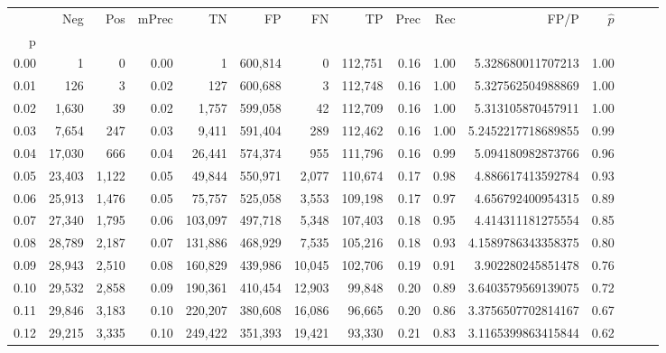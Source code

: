 \begin{tabular}{rrrrrrrrrrrrrrr}
\toprule
{} &     Neg &    Pos & mPrec &       TN &       FP &       FN &       TP &  Prec &   Rec &                    FP/P & $\hat{p}$ \\
p    &         &        &       &          &          &          &          &       &       &                         &           \\
\midrule
0.00 &       1 &      0 &  0.00 &        1 &  600,814 &        0 &  112,751 &  0.16 &  1.00 &       5.328680011707213 &      1.00 \\
0.01 &     126 &      3 &  0.02 &      127 &  600,688 &        3 &  112,748 &  0.16 &  1.00 &       5.327562504988869 &      1.00 \\
0.02 &   1,630 &     39 &  0.02 &    1,757 &  599,058 &       42 &  112,709 &  0.16 &  1.00 &       5.313105870457911 &      1.00 \\
0.03 &   7,654 &    247 &  0.03 &    9,411 &  591,404 &      289 &  112,462 &  0.16 &  1.00 &      5.2452217718689855 &      0.99 \\
0.04 &  17,030 &    666 &  0.04 &   26,441 &  574,374 &      955 &  111,796 &  0.16 &  0.99 &       5.094180982873766 &      0.96 \\
0.05 &  23,403 &  1,122 &  0.05 &   49,844 &  550,971 &    2,077 &  110,674 &  0.17 &  0.98 &       4.886617413592784 &      0.93 \\
0.06 &  25,913 &  1,476 &  0.05 &   75,757 &  525,058 &    3,553 &  109,198 &  0.17 &  0.97 &       4.656792400954315 &      0.89 \\
0.07 &  27,340 &  1,795 &  0.06 &  103,097 &  497,718 &    5,348 &  107,403 &  0.18 &  0.95 &       4.414311181275554 &      0.85 \\
0.08 &  28,789 &  2,187 &  0.07 &  131,886 &  468,929 &    7,535 &  105,216 &  0.18 &  0.93 &      4.1589786343358375 &      0.80 \\
0.09 &  28,943 &  2,510 &  0.08 &  160,829 &  439,986 &   10,045 &  102,706 &  0.19 &  0.91 &       3.902280245851478 &      0.76 \\
0.10 &  29,532 &  2,858 &  0.09 &  190,361 &  410,454 &   12,903 &   99,848 &  0.20 &  0.89 &      3.6403579569139075 &      0.72 \\
0.11 &  29,846 &  3,183 &  0.10 &  220,207 &  380,608 &   16,086 &   96,665 &  0.20 &  0.86 &      3.3756507702814167 &      0.67 \\
0.12 &  29,215 &  3,335 &  0.10 &  249,422 &  351,393 &   19,421 &   93,330 &  0.21 &  0.83 &      3.1165399863415844 &      0.62 \\

\end{tabular}
